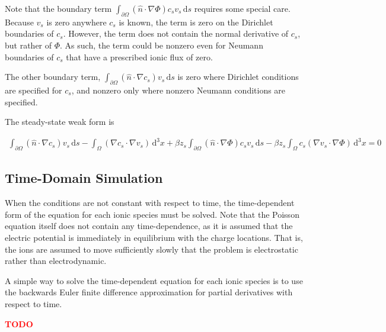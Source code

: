 Note that the boundary term
$\int_{\partial\Omega} \left( \hat{n} \cdot \nabla \Phi \right) c_s v_s \,\mathrm{d}s$
requires some special care.
Because $v_s$ is zero anywhere $c_s$ is known,
the term is zero on the Dirichlet boundaries of $c_s$.
However, the term does not contain the normal derivative of $c_s$,
but rather of $\Phi$.
As such, the term could be nonzero even for Neumann boundaries of $c_s$
that have a prescribed ionic flux of zero.

The other boundary term, $\int_{\partial\Omega} \left( \hat{n} \cdot \nabla c_s \right) v_s \,\mathrm{d}s$
is zero where Dirichlet conditions are specified for $c_s$,
and nonzero only where nonzero Neumann conditions are specified.

The steady-state weak form is

\begin{equation}
\begin{aligned}
\int_{\partial\Omega} \left( \hat{n} \cdot \nabla c_s \right) v_s \,\mathrm{d}s
- \int_\Omega \left( \nabla c_s \cdot \nabla v_s \right) \,\mathrm{d}^3x 
+ \beta z_s \int_{\partial\Omega} \left( \hat{n} \cdot \nabla \Phi \right) c_s v_s \,\mathrm{d}s
- \beta z_s \int_\Omega c_s  \left( \nabla v_s \cdot \nabla \Phi \right) \,\mathrm{d}^3x
 = 0
\end{aligned}
\end{equation}

\subsection{Time-Domain Simulation}\label{subsec:unhom_pnp_timedomain}

When the conditions are not constant with respect to time,
the time-dependent form of the equation for each ionic species must be solved.
Note that the Poisson equation itself does not contain any time-dependence,
as it is assumed that the electric potential is immediately in equilibrium with the charge locations.
That is, the ions are assumed to move sufficiently slowly that the problem
is electrostatic rather than electrodynamic.

A simple way to solve the time-dependent equation for each ionic species is to use the backwards Euler
finite difference approximation for partial derivatives with respect to time.

\textcolor{red}{\textbf{TODO}}
